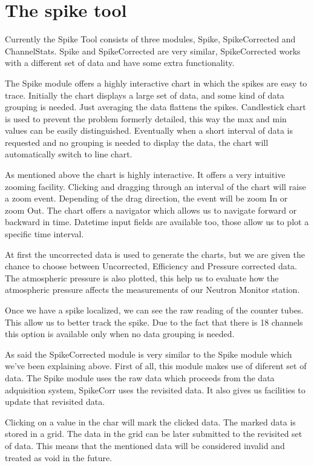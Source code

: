 \documentclass[a4paper]{jpconf}
\begin{document}
\section{The spike tool}

Currently the Spike Tool consists of three modules, Spike, SpikeCorrected and
ChannelStats. Spike and SpikeCorrected are very similar, SpikeCorrected works
with a different set of data and have some extra functionality.

The Spike module offers a highly interactive chart in which the spikes are easy
to trace. Initially the chart displays a large set of data, and some kind of
data grouping is needed. Just averaging the data flattens the spikes.
Candlestick chart is used to prevent the problem formerly detailed, this way the
max and min values can be easily distinguished. Eventually when a short interval
of data is requested and no grouping is needed to display the data, the chart
will automatically switch to line chart.

As mentioned above the chart is highly interactive. It offers a very intuitive
zooming facility. Clicking and dragging through an interval of the chart will
raise a zoom event. Depending of the drag direction, the event will be zoom In
or zoom Out. The chart offers a navigator which allows us to navigate forward or
backward in time. Datetime input fields are available too, those allow us to
plot a specific time interval.

At first the uncorrected data is used to generate the charts, but we are given
the chance to choose between Uncorrected, Efficiency and Pressure corrected
data. The atmospheric pressure is also plotted, this help us to evaluate how the
atmospheric pressure affects the measurements of our Neutron Monitor station.

Once we have a spike localized, we can see the raw reading of the counter tubes.
This allow us to better track the spike. Due to the fact that there is 18
channels this option is available only when no data grouping is needed.

As said the SpikeCorrected module is very similar to the Spike module which
we've been explaining above. First of all, this module makes use of diferent set
of data. The Spike module uses the raw data which proceeds from the data
adquisition system, SpikeCorr uses the revisited data. It also gives us
facilities to update that revisited data.

Clicking on a value in the char will mark the clicked data. The marked data is
stored in a grid. The data in the grid can be later submitted to the revisited
set of data. This means that the mentioned data will be considered invalid and
treated as void in the future.
\end{document}
